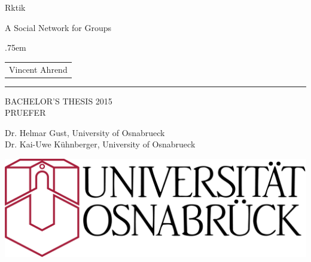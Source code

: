
\frenchspacing
\raggedbottom
\pagestyle{plain}

\begin{titlepage}
  \makeatletter
  \let\footnotesize\small
  \let\footnoterule\relax
  \let \footnote \thanks
  \null\vfil
  \begin{flushleft}%
        {\LARGE \sffamily Rktik \par}
    
    \vspace*{2cm}
        {\Large \sffamily A Social Network for Groups \par}%
    \vskip 2cm%
        {\large
     \lineskip .75em%
      \begin{tabular}[t]{c}%
       {\Huge Vincent Ahrend}
      \end{tabular}\par}%
      \rule{\linewidth}{1mm} \par
      \vskip 1cm%
    {\large BACHELOR'S THESIS 2015}\\[2cm]
    {\normalsize PRUEFER}\par
    {\large Dr. Helmar Gust, University of Osnabrueck \\ Dr. Kai-Uwe Kühnberger, University of Osnabrueck}  \par
    \vspace{3cm}
   \centering
    \includegraphics[width=0.5\linewidth]{img/uos.png}
   \end{flushleft}\par
   \makeatother
\end{titlepage}

\pagestyle{scrheadings}





\pagestyle{scrheadings}



